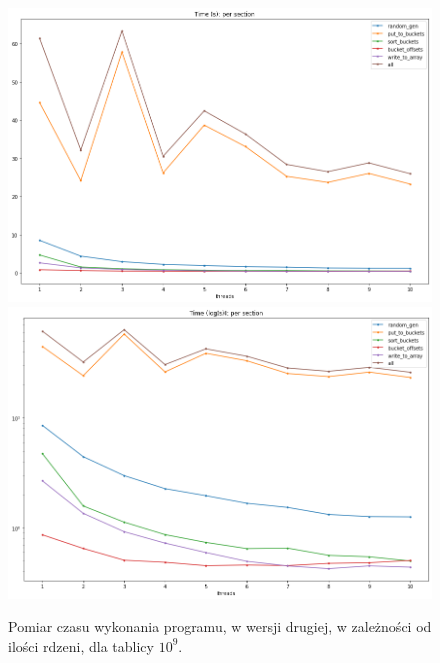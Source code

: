 \documentclass{article}
\begin{document}
        \newpage
        \begin{figure}[h!]
            \centering
            \includegraphics[width=17cm]{report2/images/Speedup/time.png}
            \includegraphics[width=17cm]{report2/images/Speedup/time_log.png}
            \caption{Pomiar czasu wykonania programu, w wersji drugiej, w zależności od ilości rdzeni, dla tablicy ${10^{9}}$. }
        \end{figure}
        
\end{document}
